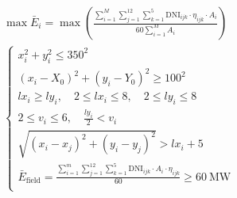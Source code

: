 \documentclass[../main.tex]{subfiles}
\begin{document}
  \begin{align}\label{2.9}
\begin{array}{c}
	\max \bar{E}_i = \max\left(\frac{\sum_{i=1}^{M} \sum_{j=1}^{12} \sum_{k=1}^{5} \text{DNI}_{ijk} \cdot \eta_{ijk} \cdot A_i}{60 \sum_{i=1}^{M} A_i}\right)
 \\
	\left\{ \begin{array}{l}
    x_i^2 + y_i^2 \leq 350^2\\
	(x_i - X_0)^2 + (y_i - Y_0)^2 \geq 100^2\\
	lx_i \geq ly_{i}, \quad 2 \leq lx_i\leq 8, \quad 2 \leq ly_i \leq 8
\\
2 \leq v_i \leq 6, \quad \frac{ly_i}{2} < v_i\\
	\sqrt{(x_i - x_j)^2 + (y_i - y_j)^2} > lx_i + 5\\
	\bar{E}_{\text{field}} = \frac{\sum_{i=1}^{m} \sum_{j=1}^{12} \sum_{k=1}^{5} \text{DNI}_{ijk} \cdot A_i \cdot \eta_{ijk}}{60} \geq 60\ \text{MW}\\
\end{array} \right.\\
\end{array}
  \end{align}


  
\end{document}
